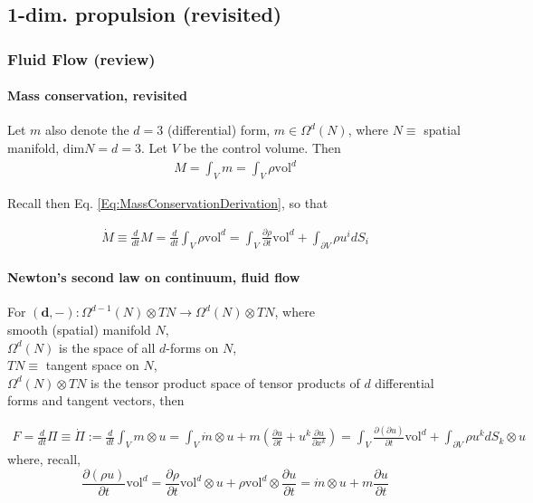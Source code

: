 \documentclass[10pt]{amsart}
\begin{document}
\begin{multicols*}{2}
\part{1-dim. propulsion (revisited)}

\section{Fluid Flow (review)}

\subsection{Mass conservation, revisited}

Let $m$ also denote the $d=3$ (differential) form, $m \in \Omega^d(N)$, where $N \equiv $ spatial manifold, $\text{dim}N = d =3$. Let $V$ be the control volume. Then
\[
\begin{gathered}
	M = \int_V m = \int_V \rho \text{vol}^d
\end{gathered}
\]

Recall then Eq. \ref{Eq:MassConservationDerivation}, so that 

\[
\begin{gathered}
\dot{M} \equiv \frac{d}{dt} M = \frac{d}{dt} \int_V \rho \text{vol}^d = \int_V \frac{ \partial \rho }{ \partial t} \text{vol}^d + \int_{\partial V} \rho u^i dS_i
\end{gathered}
\]

\subsection{Newton's second law on continuum, fluid flow}

For $(\mathbf{d}, - ) : \Omega^{d-1}(N) \otimes TN \to \Omega^d(N) \otimes TN$, where \\
smooth (spatial) manifold $N$, \\
$\Omega^{d}(N)$ is the space of all $d$-forms on $N$, \\
$TN \equiv $  tangent space on $N$, \\
$\Omega^d(N) \otimes TN$ is the tensor product space of tensor products of $d$ differential forms and tangent vectors, then

\[
\begin{gathered}
F = \frac{d}{dt} \Pi \equiv \dot{\Pi} := \frac{d}{dt} \int_V m \otimes u = \int_V \dot{m} \otimes u + m \left( \frac{\partial u}{ \partial t} + u^k \frac{ \partial u }{ \partial x^k } \right) = \int_V \frac{\partial ( \partial u ) }{ \partial t} \text{vol}^d  + \int_{\partial V} \rho u^k dS_k \otimes u
\end{gathered}
\]
where, recall,
\[
\frac{\partial (\rho u) }{ \partial t} \text{vol}^d = \frac{\partial \rho }{ \partial t} \text{vol}^d \otimes u + \rho \text{vol}^d \otimes \frac{ \partial u}{ \partial t} = \dot{m} \otimes u + m \frac{\partial u }{ \partial t}
\]


\end{multicols*}
\end{document}
